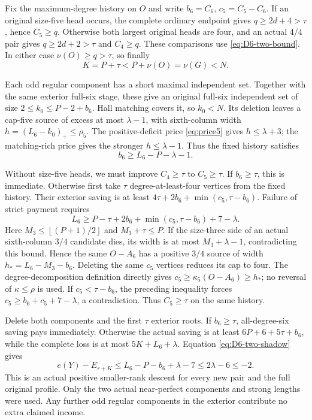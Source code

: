 \documentclass[11pt,a4paper]{article}
\newcommand{\floor}[1]{\left\lfloor#1\right\rfloor}
\theoremstyle{definition}
\begin{document}
Fix the maximum-degree history on $O$ and write $b_6=C_6$, $c_5=C_5-C_6$. If an original size-five head occurs, the complete ordinary endpoint gives $q\ge2d+4>\tau$, hence $C_5\ge q$. Otherwise both largest original heads are four, and an actual $4/4$ pair gives $q\ge2d+2>\tau$ and $C_4\ge q$. These comparisons use \eqref{eq:D6-two-bound}. In either case $\nu(O)\ge q>\tau$, so finally
\[
 K=P+\tau<P+\nu(O)=\nu(G)<N.
\]

Each odd regular component has a short maximal independent set. Together with the same exterior full-six stage, these give an original full-six independent set of size $2\le k_0\le P-2+b_6$. Hall matching covers it, so $k_0<N$. Its deletion leaves a cap-five source of excess at most $\lambda-1$, with sixth-column width $h=(L_6-k_0)_+\le\rho_5$. The positive-deficit price \eqref{eq:price5} gives $h\le\lambda+3$; the matching-rich price gives the stronger $h\le\lambda-1$. Thus the fixed history satisfies
\begin{equation}\label{eq:D6-two-shadow}
 b_6\ge L_6-P-\lambda-1.
\end{equation}

Without size-five heads, we must improve $C_4\ge\tau$ to $C_5\ge\tau$. If $b_6\ge\tau$, this is immediate. Otherwise first take $\tau$ degree-at-least-four vertices from the fixed history. Their exterior saving is at least
$4\tau+2b_6+\min(c_5,\tau-b_6)$. Failure of strict payment requires
\[
 L_6\ge P-\tau+2b_6+\min(c_5,\tau-b_6)+7-\lambda.
\]
Here $M_3\le\floor{(P+1)/2}$ and $M_3+\tau\le P$. If the size-three side of an actual sixth-column $3/4$ candidate dies, its width is at most $M_3+\lambda-1$, contradicting this bound. Hence the same $O-A_6$ has a positive $3/4$ source of width $h_*=L_6-M_3-b_6$. Deleting the same $c_5$ vertices reduces its cap to four. The degree-decomposition definition directly gives
$c_5\ge\kappa_5(O-A_6)\ge h_*$; no reversal of $\kappa\le\rho$ is used. If $c_5<\tau-b_6$, the preceding inequality forces
$c_5\ge b_6+c_5+7-\lambda$, a contradiction. Thus $C_5\ge\tau$ on the same history.

Delete both components and the first $\tau$ exterior roots. If $b_6\ge\tau$, all-degree-six saving pays immediately. Otherwise the actual saving is at least $6P+6+5\tau+b_6$, while the complete loss is at most $5K+L_6+\lambda$. Equation \eqref{eq:D6-two-shadow} gives
\[
 e(Y)-E_{r+K}
 \le L_6-P-b_6+\lambda-7\le2\lambda-6\le-2.
\]
This is an actual positive smaller-rank descent for every new pair and the full original profile. Only the two actual near-perfect components and strong lengths were used. Any further odd regular components in the exterior contribute no extra claimed income.
\end{document}
